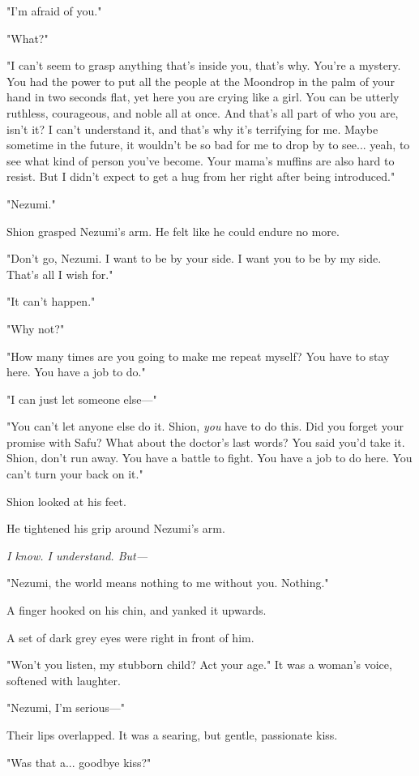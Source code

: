 "I'm afraid of you."

"What?"

"I can't seem to grasp anything that's inside you, that's why. You're a
mystery. You had the power to put all the people at the Moondrop in the
palm of your hand in two seconds flat, yet here you are crying like a
girl. You can be utterly ruthless, courageous, and noble all at once.
And that's all part of who you are, isn't it? I can't understand it, and
that's why it's terrifying for me. Maybe sometime in the future, it
wouldn't be so bad for me to drop by to see... yeah, to see what kind of
person you've become. Your mama's muffins are also hard to resist. But I
didn't expect to get a hug from her right after being introduced."

"Nezumi."

Shion grasped Nezumi's arm. He felt like he could endure no more.

"Don't go, Nezumi. I want to be by your side. I want you to be by my
side. That's all I wish for."

"It can't happen."

"Why not?"

"How many times are you going to make me repeat myself? You have to stay
here. You have a job to do."

"I can just let someone else---"

"You can't let anyone else do it. Shion, \emph{you} have to do this. Did you
forget your promise with Safu? What about the doctor's last words? You
said you'd take it. Shion, don't run away. You have a battle to fight.
You have a job to do here. You can't turn your back on it."

Shion looked at his feet.

He tightened his grip around Nezumi's arm.

\emph{I know. I understand. But---}

"Nezumi, the world means nothing to me without you. Nothing."

A finger hooked on his chin, and yanked it upwards.

A set of dark grey eyes were right in front of him.

"Won't you listen, my stubborn child? Act your age." It was a woman's
voice, softened with laughter.

"Nezumi, I'm serious---"

Their lips overlapped. It was a searing, but gentle, passionate kiss.

"Was that a... goodbye kiss?"

